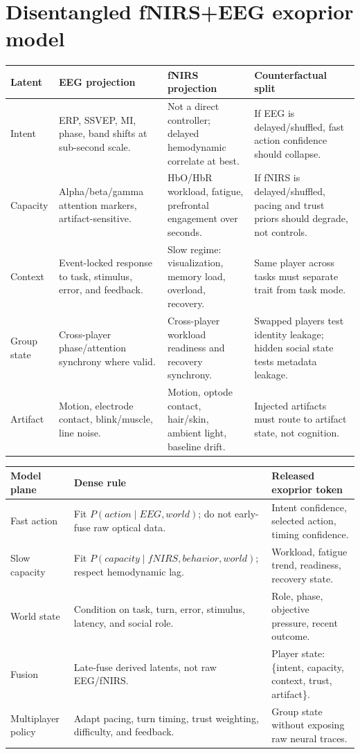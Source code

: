 \documentclass[10pt]{article}
\begin{document}
\section{Disentangled fNIRS+EEG exoprior model}

\begin{center}\scriptsize
\begin{tabular}{|L{0.9in}|L{1.45in}|L{1.45in}|L{2.2in}|}
\hline
\textbf{Latent} & \textbf{EEG projection} & \textbf{fNIRS projection} & \textbf{Counterfactual split} \\
\hline
Intent & ERP, SSVEP, MI, phase, band shifts at sub-second scale. & Not a direct controller; delayed hemodynamic correlate at best. & If EEG is delayed/shuffled, fast action confidence should collapse. \\
\hline
Capacity & Alpha/beta/gamma attention markers, artifact-sensitive. & HbO/HbR workload, fatigue, prefrontal engagement over seconds. & If fNIRS is delayed/shuffled, pacing and trust priors should degrade, not controls. \\
\hline
Context & Event-locked response to task, stimulus, error, and feedback. & Slow regime: visualization, memory load, overload, recovery. & Same player across tasks must separate trait from task mode. \\
\hline
Group state & Cross-player phase/attention synchrony where valid. & Cross-player workload readiness and recovery synchrony. & Swapped players test identity leakage; hidden social state tests metadata leakage. \\
\hline
Artifact & Motion, electrode contact, blink/muscle, line noise. & Motion, optode contact, hair/skin, ambient light, baseline drift. & Injected artifacts must route to artifact state, not cognition. \\
\hline
\end{tabular}
\end{center}

\begin{center}\scriptsize
\begin{tabular}{|L{1.15in}|L{2.15in}|L{2.75in}|}
\hline
\textbf{Model plane} & \textbf{Dense rule} & \textbf{Released exoprior token} \\
\hline
Fast action & Fit \(P(action \mid EEG, world)\); do not early-fuse raw optical data. & Intent confidence, selected action, timing confidence. \\
\hline
Slow capacity & Fit \(P(capacity \mid fNIRS, behavior, world)\); respect hemodynamic lag. & Workload, fatigue trend, readiness, recovery state. \\
\hline
World state & Condition on task, turn, error, stimulus, latency, and social role. & Role, phase, objective pressure, recent outcome. \\
\hline
Fusion & Late-fuse derived latents, not raw EEG/fNIRS. & Player state: \{intent, capacity, context, trust, artifact\}. \\
\hline
Multiplayer policy & Adapt pacing, turn timing, trust weighting, difficulty, and feedback. & Group state without exposing raw neural traces. \\
\hline
\end{tabular}
\end{center}
\end{document}
